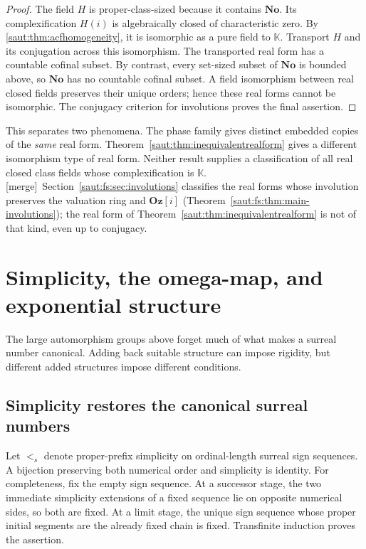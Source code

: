 \documentclass[11pt]{article}
\theoremstyle{definition}
\theoremstyle{remark}
\newcommand{\No}{\mathbf{No}}
\newcommand{\K}{\mathbb K}
\newcommand{\Oz}{\mathbf{Oz}}
\newcommand{\mergetag}{\textup{[merge]}}
\numberwithin{equation}{section}
\begin{document}
\begin{proof}
The field $H$ is proper-class-sized because it contains $\No$. Its
complexification $H(i)$ is algebraically closed of characteristic zero.
By \cref{saut:thm:acfhomogeneity}, it is isomorphic as a pure field to $\K$.
Transport $H$ and its conjugation across this isomorphism.
The transported real form has a countable cofinal subset. By contrast,
every set-sized subset of $\No$ is bounded above, so $\No$ has no countable
cofinal subset. A field isomorphism between real closed fields preserves
their unique orders; hence these real forms cannot be isomorphic.
The conjugacy criterion for involutions proves the final assertion.
\end{proof}

This separates two phenomena. The phase family gives distinct embedded
copies of the \emph{same} real form. Theorem~\ref{saut:thm:inequivalentrealform}
gives a different isomorphism type of real form. Neither result supplies a
classification of all real closed class fields whose complexification is
$\K$. \mergetag\ Section~\ref{saut:fs:sec:involutions} classifies the real forms
whose involution preserves the valuation ring and $\Oz[i]$
(Theorem~\ref{saut:fs:thm:main-involutions}); the real form of
Theorem~\ref{saut:thm:inequivalentrealform} is not of that kind, even up to
conjugacy.

\section{Simplicity, the omega-map, and exponential structure}\label{saut:sec:exponential}

The large automorphism groups above forget much of what makes a surreal
number canonical. Adding back suitable structure can impose rigidity, but
different added structures impose different conditions.

\subsection{Simplicity restores the canonical surreal numbers}

Let $<_{s}$ denote proper-prefix simplicity on ordinal-length surreal sign
sequences. A bijection preserving both numerical order and simplicity is
identity. For completeness, fix the empty sign sequence. At a successor
stage, the two immediate simplicity extensions of a fixed sequence lie on
opposite numerical sides, so both are fixed. At a limit stage, the unique
sign sequence whose proper initial segments are the already fixed chain
is fixed. Transfinite induction proves the assertion.
\end{document}
